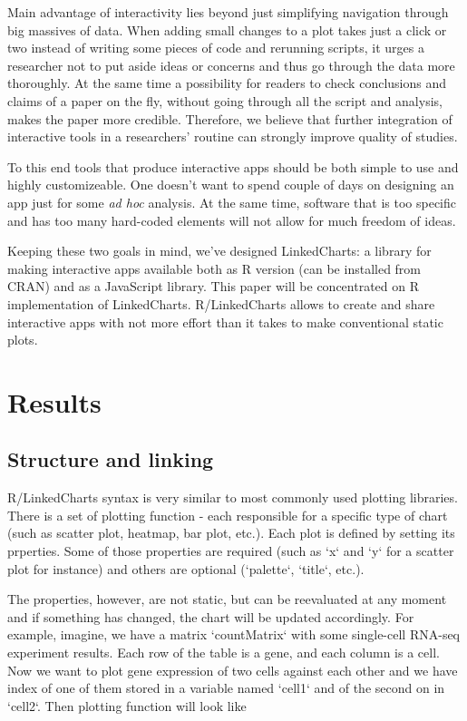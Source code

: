 \documentclass[twocolumn,10pt]{article}
\begin{document}
Main advantage of interactivity lies beyond just simplifying navigation through big massives of data. When adding small changes to a plot takes just a click or two instead of writing some pieces of code and rerunning scripts, it urges a researcher not to put aside ideas or concerns and thus go through the data more thoroughly. At the same time a possibility for readers to check conclusions and claims of a paper on the fly, without going through all the script and analysis, makes the paper more credible. Therefore, we believe that further integration of interactive tools in a researchers' routine can strongly improve quality of studies.

To this end tools that produce interactive apps should be both simple to use and highly customizeable. One doesn't want to spend couple of days on designing an app just for some \emph{ad hoc} analysis. At the same time, software that is too specific and has too many hard-coded elements will not allow for much freedom of ideas.

Keeping these two goals in mind, we've designed LinkedCharts: a library for making interactive apps available both as R version (can be installed from CRAN) and as a JavaScript library. This paper will be concentrated on R implementation of LinkedCharts. R/LinkedCharts allows to create and share interactive apps with not more effort than it takes to make conventional static plots.

\section{Results}
\subsection{Structure and linking}
R/LinkedCharts syntax is very similar to most commonly used plotting libraries. There is a set of plotting function - each responsible for a specific type of chart (such as scatter plot, heatmap, bar plot, etc.). Each plot is defined by setting its prperties. Some of those properties are required (such as `x` and `y` for a scatter plot for instance) and others are optional (`palette`, `title`, etc.).

The properties, however, are not static, but can be reevaluated at any moment and if something has changed, the chart will be updated accordingly. For example, imagine, we have a matrix `countMatrix` with some single-cell RNA-seq experiment results. Each row of the table is a gene, and each column is a cell. Now we want to plot gene expression of two cells against each other and we have index of one of them stored in a variable named `cell1` and of the second on in `cell2`. Then plotting function will look like
\end{document}
